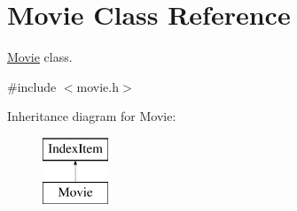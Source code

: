 \hypertarget{class_movie}{}\section{Movie Class Reference}
\label{class_movie}


\hyperlink{class_movie}{Movie} class.  




{\ttfamily \#include $<$movie.\+h$>$}

Inheritance diagram for Movie\+:\begin{figure}[H]
\begin{center}
\leavevmode
\includegraphics[height=2.000000cm]{class_movie}
\end{center}
\end{figure}
